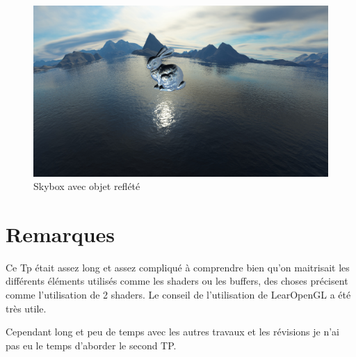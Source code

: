 \documentclass{article}
\begin{document}
\begin{figure}[h]
    \center
    \includegraphics[scale=0.3]{skyboxObjReflex.png}
    \caption{Skybox avec objet reflété}
\end{figure}



\section{Remarques}

Ce Tp était assez long et assez compliqué à comprendre bien qu'on maitrisait les différents éléments utilisés comme les shaders ou les buffers, des choses précisent comme l'utilisation de 2 shaders.
Le conseil de l'utilisation de LearOpenGL a été très utile.

Cependant long et peu de temps avec les autres travaux et les révisions je n'ai pas eu le temps d'aborder le second TP.
\end{document}
